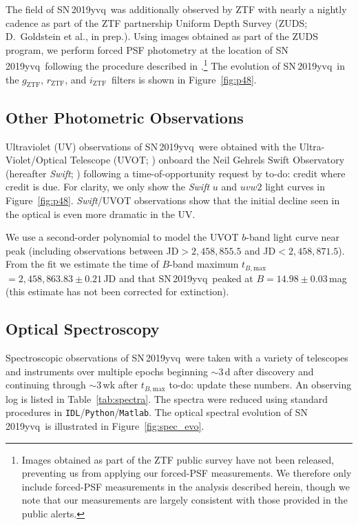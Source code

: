 \documentclass[twocolumn]{aastex63}
\newcommand{\todo}[1]{{\color{magenta} to-do: {#1}}}
\newcommand{\rztf}{$r_\mathrm{ZTF}$}
\newcommand{\gztf}{$g_\mathrm{ZTF}$}
\newcommand{\iztf}{$i_\mathrm{ZTF}$}
\newcommand{\tbmax}{$t_{B,\mathrm{max}}$}
\newcommand{\sn}{SN\,2019yvq}
\begin{document}
The field of \sn\ was additionally observed by ZTF with nearly a nightly
cadence as part of the ZTF partnership Uniform Depth Survey (ZUDS;
D.~Goldstein et al., in prep.). Using images obtained as part of the ZUDS
program, we perform forced PSF photometry at the location of \sn\ following
the procedure described in \citet{Yao19}.\footnote{Images obtained as part of
the ZTF public survey have not been released, preventing us from applying our
forced-PSF measurements. We therefore only include forced-PSF measurements in
the analysis described herein, though we note that our measurements are
largely consistent with those provided in the public alerts.} The evolution
of \sn\ in the \gztf, \rztf, and \iztf\ filters is shown in
Figure~\ref{fig:p48}.

\subsection{Other Photometric Observations}

Ultraviolet (UV) observations of \sn\ were obtained with the
Ultra-Violet/Optical Telescope (UVOT; \citet{Roming05}) onboard the Neil
Gehrels Swift Observatory (hereafter \textit{Swift}; \citealt{Gehrels04})
following a time-of-opportunity request by \todo{credit where credit is due}.
For clarity, we only show the \textit{Swift} $u$ and $uvw2$ light curves in
Figure~\ref{fig:p48}. \textit{Swift}/UVOT observations show that the initial
decline seen in the optical is even more dramatic in the UV. 

We use a second-order polynomial to model the UVOT $b$-band light curve near
peak (including observations between JD$> 2,458,855.5$ and JD$<
2,458,871.5$). From the fit we estimate the time of $B$-band maximum \tbmax$
= 2,458,863.83 \pm 0.21$\,JD and that \sn\ peaked at $B = 14.98 \pm
0.03$\,mag (this estimate has not been corrected for extinction).

\subsection{Optical Spectroscopy}

Spectroscopic observations of \sn\ were taken with a variety of telescopes
and instruments over multiple epochs beginning $\sim$3\,d after discovery and
continuing through $\sim$3\,wk after \tbmax \todo{update these numbers}. An
observing log is listed in Table~\ref{tab:spectra}. The spectra were reduced
using standard procedures in \texttt{IDL}/\texttt{Python}/\texttt{Matlab}.
The optical spectral evolution of \sn\ is illustrated in
Figure~\ref{fig:spec_evo}.
\end{document}
